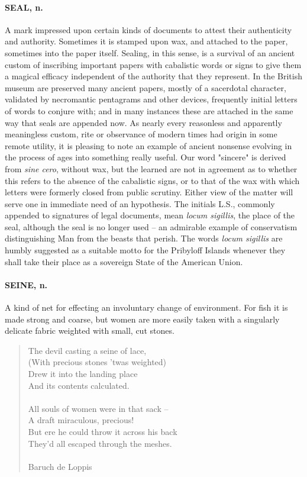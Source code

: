 \documentclass[11pt]{article}
\begin{document}
\paragraph{SEAL, n.}  A mark impressed upon certain kinds of documents to attest
their authenticity and authority.  Sometimes it is stamped upon wax,
and attached to the paper, sometimes into the paper itself.  Sealing,
in this sense, is a survival of an ancient custom of inscribing
important papers with cabalistic words or signs to give them a magical
efficacy independent of the authority that they represent.  In the
British museum are preserved many ancient papers, mostly of a
sacerdotal character, validated by necromantic pentagrams and other
devices, frequently initial letters of words to conjure with; and in
many instances these are attached in the same way that seals are
appended now.  As nearly every reasonless and apparently meaningless
custom, rite or observance of modern times had origin in some remote
utility, it is pleasing to note an example of ancient nonsense
evolving in the process of ages into something really useful.  Our
word "sincere" is derived from {\em sine cero}, without wax, but the
learned are not in agreement as to whether this refers to the absence
of the cabalistic signs, or to that of the wax with which letters were
formerly closed from public scrutiny.  Either view of the matter will
serve one in immediate need of an hypothesis.  The initials L.S.,
commonly appended to signatures of legal documents, mean {\em locum
sigillis}, the place of the seal, although the seal is no longer used
-- an admirable example of conservatism distinguishing Man from the
beasts that perish.  The words {\em locum sigillis} are humbly suggested
as a suitable motto for the Pribyloff Islands whenever they shall take
their place as a sovereign State of the American Union.

\paragraph{SEINE, n.}  A kind of net for effecting an involuntary change of
environment.  For fish it is made strong and coarse, but women are
more easily taken with a singularly delicate fabric weighted with
small, cut stones.

\begin{quote}   The devil casting a seine of lace, \\
      (With precious stones 'twas weighted) \\
  Drew it into the landing place \\
      And its contents calculated. \\
 \\
  All souls of women were in that sack -- \\
      A draft miraculous, precious! \\
  But ere he could throw it across his back \\
      They'd all escaped through the meshes. \\
 \\
Baruch de Loppis \end{quote}
\end{document}

